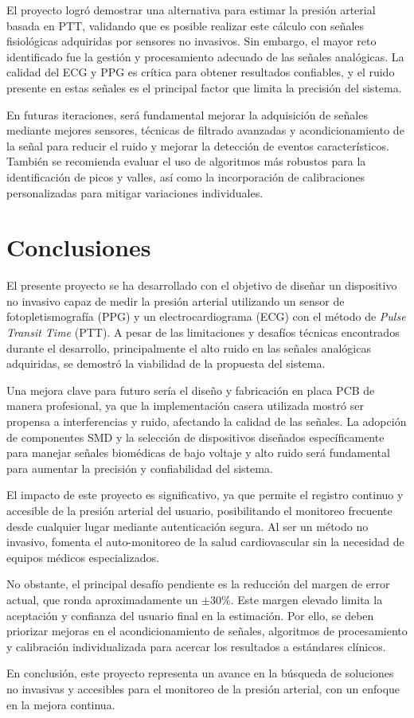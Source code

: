     El proyecto logró demostrar una alternativa para estimar la presión arterial basada en PTT, validando que es posible realizar este cálculo con señales fisiológicas adquiridas por sensores no invasivos. Sin embargo, el mayor reto identificado fue la gestión y procesamiento adecuado de las señales analógicas. La calidad del ECG y PPG es crítica para obtener resultados confiables, y el ruido presente en estas señales es el principal factor que limita la precisión del sistema.

    En futuras iteraciones, será fundamental mejorar la adquisición de señales mediante mejores sensores, técnicas de filtrado avanzadas y acondicionamiento de la señal para reducir el ruido y mejorar la detección de eventos característicos. También se recomienda evaluar el uso de algoritmos más robustos para la identificación de picos y valles, así como la incorporación de calibraciones personalizadas para mitigar variaciones individuales.

\newpage
\section{Conclusiones}
    
    El presente proyecto se ha desarrollado con el objetivo de diseñar un dispositivo no invasivo capaz de medir la presión arterial utilizando un sensor de fotopletismografía (PPG) y un electrocardiograma (ECG) con el método de \textit{Pulse Transit Time} (PTT). A pesar de las limitaciones y desafíos técnicas encontrados durante el desarrollo, principalmente el alto ruido en las señales analógicas adquiridas, se demostró la viabilidad de la propuesta del sistema. 

    Una mejora clave para futuro sería el diseño y fabricación en placa PCB de manera profesional, ya que la implementación casera utilizada mostró ser propensa a interferencias y ruido, afectando la calidad de las señales. La adopción de componentes SMD y la selección de dispositivos diseñados específicamente para manejar señales biomédicas de bajo voltaje y alto ruido será fundamental para aumentar la precisión y confiabilidad del sistema.

    El impacto de este proyecto es significativo, ya que permite el registro continuo y accesible de la presión arterial del usuario, posibilitando el monitoreo frecuente desde cualquier lugar mediante autenticación segura. Al ser un método no invasivo, fomenta el auto-monitoreo de la salud cardiovascular sin la necesidad de equipos médicos especializados.

    No obstante, el principal desafío pendiente es la reducción del margen de error actual, que ronda aproximadamente un $\pm30\%$. Este margen elevado limita la aceptación y confianza del usuario final en la estimación. Por ello, se deben priorizar mejoras en el acondicionamiento de señales, algoritmos de procesamiento y calibración individualizada para acercar los resultados a estándares clínicos.

    En conclusión, este proyecto representa un avance en la búsqueda de soluciones no invasivas y accesibles para el monitoreo de la presión arterial, con un enfoque en la mejora continua.
